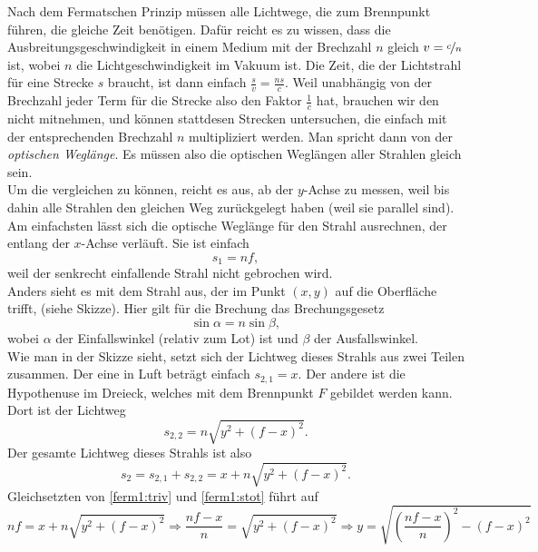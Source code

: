 \begin{Answer}[ref = ferm1]
	Nach dem Fermatschen Prinzip müssen alle Lichtwege, die zum Brennpunkt führen, die gleiche Zeit benötigen. Dafür reicht es zu wissen, dass die Ausbreitungsgeschwindigkeit in einem Medium mit der Brechzahl $n$ gleich $v = \nicefrac{c}{n}$ ist, wobei $n$ die Lichtgeschwindigkeit im Vakuum ist. Die Zeit, die der Lichtstrahl für eine Strecke $s$ braucht, ist dann einfach $\frac{s}{v}= \frac{ns}{c}$. Weil unabhängig von der Brechzahl jeder Term für die Strecke also den Faktor $\frac{1}{c}$ hat, brauchen wir den nicht mitnehmen, und können stattdesen Strecken untersuchen, die einfach mit der entsprechenden Brechzahl $n$ multipliziert werden. Man spricht dann von der \textit{optischen Weglänge}. Es müssen also die optischen Weglängen aller Strahlen gleich sein.\\
	Um die vergleichen zu können, reicht es aus, ab der $y$-Achse zu messen, weil bis dahin alle Strahlen den gleichen Weg zurückgelegt haben (weil sie parallel sind).\\
	Am einfachsten lässt sich die optische Weglänge für den Strahl ausrechnen, der entlang der $x$-Achse verläuft. Sie ist einfach 
	\begin{equation}\label{ferm1:triv}
		s_1 = n f,
	\end{equation}
	weil der senkrecht einfallende Strahl nicht gebrochen wird.\\
	Anders sieht es mit dem Strahl aus, der im Punkt $\left(x,y\right)$ auf die Oberfläche trifft, (siehe Skizze). Hier gilt für die Brechung das Brechungsgesetz
	\begin{equation*}
		\sin \alpha = n \sin \beta,
	\end{equation*}
	wobei $\alpha$ der Einfallswinkel (relativ zum Lot) ist und $\beta$ der Ausfallswinkel.\\
	Wie man in der Skizze sieht, setzt sich der Lichtweg dieses Strahls aus zwei Teilen zusammen. Der eine in Luft beträgt einfach $s_{2,1} = x$. Der andere ist die Hypothenuse im Dreieck, welches mit dem Brennpunkt $F$ gebildet werden kann. Dort ist der Lichtweg
	\begin{equation}
		s_{2,2} = n \sqrt{y^2+\left(f-x\right)^2}.
	\end{equation}
	Der gesamte Lichtweg dieses Strahls ist also 
	\begin{equation}\label{ferm1:stot}
		s_{2} = s_{2,1} + s_{2,2} = x + n\sqrt{y^2+\left(f-x\right)^2}.
	\end{equation}
	Gleichsetzten von \eqref{ferm1:triv} und \eqref{ferm1:stot} führt auf
	\begin{equation}
		n f = x + n \sqrt{y^2+\left(f-x\right)^2} \Rightarrow \frac{n f- x}{n} =  \sqrt{y^2+\left(f-x\right)^2} \Rightarrow y = \sqrt{ \left( \frac{n f- x}{n} \right)^2 - \left(f-x\right)^2}
	\end{equation}


	

\end{Answer}

	
